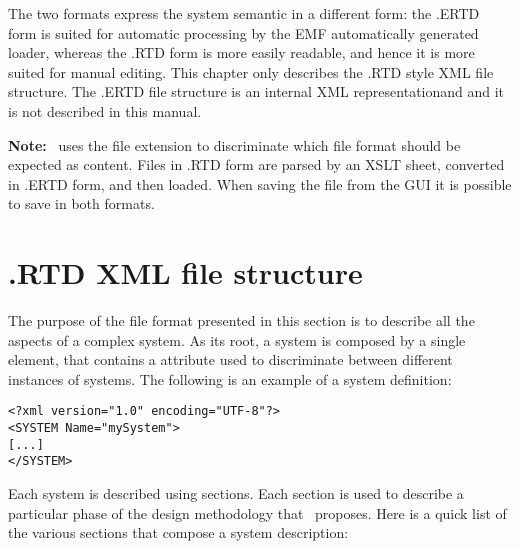 The two formats express the system semantic in a different form: the
.ERTD form is suited for automatic processing by the EMF automatically
generated loader, whereas the .RTD form is more easily readable, and
hence it is more suited for manual editing. This chapter only
describes the .RTD style XML file structure. The .ERTD file structure
is an internal XML representationand and it is not described in this
manual.

\textbf{Note:} \rtd\ uses the file extension to discriminate which
file format should be expected as content. Files in .RTD form are
parsed by an XSLT sheet, converted in .ERTD form, and then loaded.
When saving the file from the GUI it is possible to save in both formats.


\section{.RTD XML file structure}

The purpose of the file format presented in this section is to describe
all the aspects of a complex system. As its root, a system is composed
by a single  element, that contains a 
attribute used to discriminate between different instances of systems.
The following is an example of a system definition:

\begin{lstlisting}
<?xml version="1.0" encoding="UTF-8"?>
<SYSTEM Name="mySystem">
[...]
</SYSTEM>
\end{lstlisting}

Each system is described using sections. Each section is used to
describe a particular phase of the design methodology that
\rtd\ proposes.  Here is a quick list of the various sections that
compose a system description:

